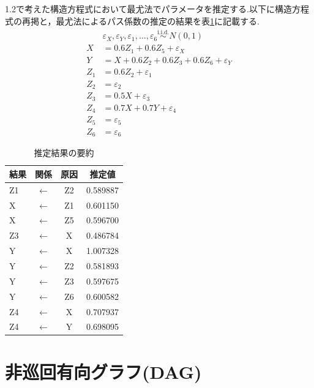 \documentclass[uplatex, dvipdfmx]{jsarticle}
\begin{document}
\begin{exm}{}
  1.2で考えた構造方程式において最尤法でパラメータを推定する.以下に構造方程式の再掲と，最尤法によるパス係数の推定の結果を表\ref{tab:results_2}に記載する.
  \begin{align}
      &\varepsilon_X, \varepsilon_Y, \varepsilon_1, \dots, \varepsilon_6 \overset{\text{i.i.d.}}{\sim} N(0, 1) \\
      X  &= 0.6Z_1 + 0.6Z_5 + \varepsilon_X \\
      Y  &= X + 0.6Z_2 + 0.6Z_3 + 0.6Z_6 + \varepsilon_Y \\
      Z_1 &= 0.6Z_2 + \varepsilon_1 \\
      Z_2 &= \varepsilon_2 \\
      Z_3 &= 0.5X + \varepsilon_3 \\
      Z_4 &= 0.7X + 0.7Y + \varepsilon_4 \\
      Z_5 &= \varepsilon_5 \\
      Z_6 &= \varepsilon_6 
  \end{align}

  \begin{table}[H]
    \centering
    \caption{推定結果の要約}
    \label{tab:results_2}
    \begin{tabular}{lccc}
      \hline
      結果 & 関係 & 原因 & 推定値 \\ \hline
      Z1 & $\leftarrow$ & Z2 & 0.589887 \\
      X & $\leftarrow$ & Z1 & 0.601150 \\
      X & $\leftarrow$ & Z5 & 0.596700 \\
      Z3 & $\leftarrow$ & X & 0.486784 \\
      Y & $\leftarrow$ & X & 1.007328 \\
      Y & $\leftarrow$ & Z2 & 0.581893 \\
      Y & $\leftarrow$ & Z3 & 0.597675 \\
      Y & $\leftarrow$ & Z6 & 0.600582 \\
      Z4 & $\leftarrow$ & X & 0.707937 \\
      Z4 & $\leftarrow$ & Y & 0.698095 \\ \hline
    \end{tabular}
  \end{table}
\end{exm}

\newpage

\section{非巡回有向グラフ(DAG)}
\end{document}
